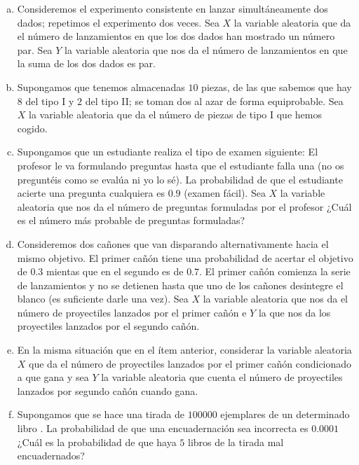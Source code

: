 \documentclass[12pt]{article}
\begin{document}
\begin{enumerate}[a)]
\item Consideremos el experimento  consistente en lanzar simultáneamente dos dados; repetimos
el experimento dos veces. Sea $X$ la variable aleatoria que da  el número de
lanzamientos en que los dos dados han mostrado un número par. Sea $Y$ la variable aleatoria
que nos da el número de lanzamientos en que la suma de los dos dados es par.

\item  Supongamos que tenemos almacenadas $10$ piezas, de las que sabemos que hay $8$ del
tipo I y $2$ del tipo II; se toman dos al azar de forma equiprobable. Sea $X$ la variable
aleatoria que da el número de piezas de tipo I que hemos cogido.

\item  Supongamos  que un estudiante realiza el tipo de examen siguiente: El profesor le va
formulando preguntas hasta que el estudiante falla una (no os preguntéis como se evalúa ni
yo lo sé). La probabilidad  de que el estudiante acierte  una pregunta cualquiera es $0.9$
(examen fácil). Sea $X$ la variable aleatoria que nos da el número de preguntas formuladas
por el profesor ¿Cuál es el número más probable de preguntas formuladas?

\item   Consideremos  dos cañones que van disparando alternativamente hacia el mismo
objetivo. El primer cañón tiene una probabilidad de acertar el objetivo de $0.3$ mientas
que en el segundo es de $0.7$. El primer cañón comienza la serie de lanzamientos y no se
detienen hasta que uno de los cañones desintegre el blanco (es suficiente darle una vez).
Sea $X$ la variable aleatoria que nos da el número de proyectiles lanzados por el primer
cañón e $Y$ la que nos da los proyectiles lanzados por el segundo cañón.

\item  En la misma situación que en el ítem anterior,
considerar la variable aleatoria $X$ que da el número de proyectiles lanzados por el primer
cañón condicionado a que gana  y sea  $Y$ la variable aleatoria que cuenta el número de
proyectiles lanzados por segundo cañón cuando gana.

\item  Supongamos que se hace una tirada de $100000$ ejemplares de un determinado libro
. La probabilidad de que una encuadernación sea incorrecta es  $0.0001$ ¿Cuál es la
probabilidad de que haya $5$ libros de la tirada mal encuadernados?


\end{enumerate}
\end{document}
